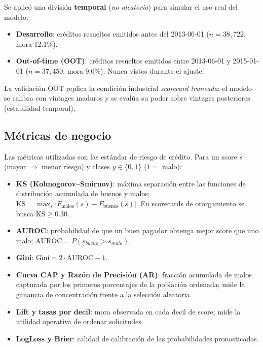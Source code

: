\documentclass[11pt, letterpaper]{article}
\newcommand{\bt}[1]{\textbf{#1}}
\begin{document}
Se aplicó una división \bt{temporal} (\emph{no aleatoria}) para simular el uso
real del modelo:

\begin{itemize}[leftmargin=2em]
  \item \bt{Desarrollo}: créditos resueltos emitidos antes del 2013-06-01
        ($n=38{,}722$, mora 12.1\%).
  \item \bt{Out-of-time (OOT)}: créditos resueltos emitidos entre 2013-06-01 y
        2015-01-01 ($n=37{,}450$, mora 9.0\%). Nunca vistos durante el ajuste.
\end{itemize}

La validación OOT replica la condición industrial \emph{scorecard truncada}:
el modelo se calibra con vintages maduros y se evalúa su poder sobre vintages
posteriores (estabilidad temporal).

\subsection{Métricas de negocio}

Las métricas utilizadas son las estándar de riesgo de crédito. Para un score
$s$ (mayor $\Rightarrow$ menor riesgo) y clases $y\in\{0,1\}$ ($1=$ malo):

\begin{itemize}[leftmargin=2em]
  \item \bt{KS (Kolmogorov--Smirnov)}: máxima separación entre las funciones
        de distribución acumulada de buenos y malos;
        $\mathrm{KS} = \max_s |F_{\text{malos}}(s) - F_{\text{buenos}}(s)|$.
        En scorecards de otorgamiento se busca $\mathrm{KS} \geq 0.30$.
  \item \bt{AUROC}: probabilidad de que un buen pagador obtenga mejor score
        que uno malo; $\mathrm{AUROC} = P(s_{bueno} > s_{malo})$.
  \item \bt{Gini}: $\mathrm{Gini} = 2\cdot\mathrm{AUROC} - 1$.
  \item \bt{Curva CAP y Razón de Precisión (AR)}: fracción acumulada de malos
        capturada por los primeros porcentajes de la población ordenada;
        mide la ganancia de concentración frente a la selección aleatoria.
  \item \bt{Lift y tasas por decil}: mora observada en cada decil de score;
        mide la utilidad operativa de ordenar solicitudes.
  \item \bt{LogLoss y Brier}: calidad de calibración de las probabilidades
        pronosticadas.
\end{itemize}
\end{document}
